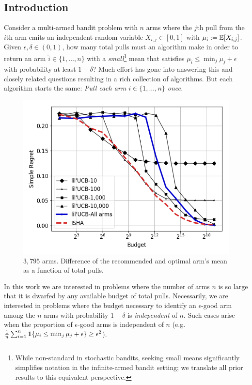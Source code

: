 
\subsection{Introduction}\label{intro}
Consider a multi-armed bandit problem with $n$ arms where the $j$th pull from the $i$th arm emits an independent random variable $X_{i,j} \in [0,1]$ with $\mu_i:=\mathbb{E}[X_{i,j}]$. 
Given $\epsilon,\delta \in (0,1)$, how many total pulls must an algorithm make in order to return an arm $\widehat{i} \in \{1,\dots,n\}$ with a \emph{small}\footnote{While non-standard in stochastic bandits, seeking small means significantly simplifies notation in the infinite-armed bandit setting; we translate all prior results to this equivalent perspective.} mean that satisfies $\mu_{\widehat{i}} \leq \displaystyle\min_{j} \mu_j + \epsilon$ with probability at least $1-\delta$?
Much effort has gone into answering this and closely related questions resulting in a rich collection of algorithms.
But each algorithm starts the same:  \textit{Pull each arm $i \in \{1,\dots,n\}$ once.}

%
%
\begin{figure}
\includegraphics[width=.4\textwidth]{fixedbudget/figures/folder5/new_yorker.png}
\caption{$3,795$ arms. Difference of the recommended and optimal arm's mean as a function of total pulls. }
\label{fig:newyorker}
\vspace{-1.5em}
\end{figure}
%
%

In this work we are interested in problems where the number of arms $n$ is so large that it is dwarfed by any available budget of total pulls.
Necessarily, we are interested in problems where the budget necessary to identify an $\epsilon$-good arm among the $n$ arms with probability $1-\delta$ is \emph{independent} of $n$. 
Such cases arise when the proportion of $\epsilon$-good arms is independent of $n$ (e.g. $\frac{1}{n} \sum_{i=1}^n \mathbf{1}\{ \mu_i \leq \min_j \mu_j + \epsilon\} \geq \epsilon^2$).

